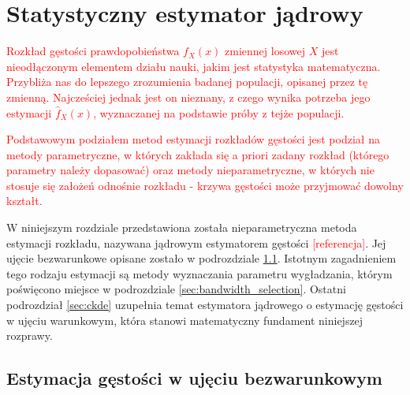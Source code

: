 \documentclass[12pt,a4paper,oneside]{book}
\theoremstyle{definition}
\begin{document}
\chapter{Statystyczny estymator jądrowy}

\textcolor{red}{Rozkład gęstości prawdopobieństwa $f_X(x)$ zmiennej losowej $X$ jest nieodłączonym elementem działu nauki, jakim jest statystyka matematyczna. Przybliża nas do lepszego zrozumienia badanej populacji, opisanej przez tę zmienną. Najcześciej jednak jest on nieznany, z czego wynika potrzeba jego estymacji $\hat{f}_X(x)$, wyznaczanej na podstawie próby z tejże populacji.}

\textcolor{red}{Podstawowym podziałem metod estymacji rozkładów gęstości jest podział na metody parametryczne, w których zakłada się a priori zadany rozkład (którego parametry należy dopasować) oraz metody nieparametryczne, w których nie stosuje się założeń odnośnie rozkładu - krzywa gęstości może przyjmować dowolny kształt.}

W niniejszym rozdziale przedstawiona została nieparametryczna metoda estymacji rozkładu, nazywana jądrowym estymatorem gęstości \textcolor{red}{[referencja]}. Jej ujęcie bezwarunkowe opisane zostało w podrozdziale \ref{sec:kde}. Istotnym zagadnieniem tego rodzaju estymacji są metody wyznaczania parametru wygładzania, którym poświęcono miejsce w podrozdziale \ref{sec:bandwidth_selection}. Ostatni podrozdział \ref{sec:ckde} uzupełnia temat estymatora jądrowego o estymację gęstości w ujęciu warunkowym, która stanowi matematyczny fundament niniejszej rozprawy.

\section{Estymacja gęstości w ujęciu bezwarunkowym} \label{sec:kde}
\end{document}
